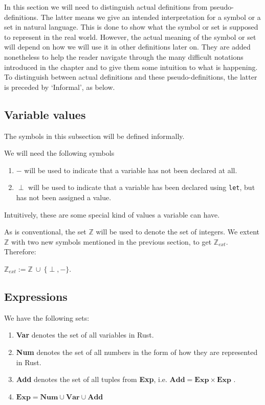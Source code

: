 In this section we will need to distinguish actual definitions from pseudo-definitions. The latter means we give an intended interpretation for a symbol or a set in natural language. This is done to show what the symbol or set is supposed to represent in the real world. However, the actual meaning of the symbol or set will depend on how we will use it in other definitions later on. They are added nonetheless to help the reader navigate through the many difficult notations introduced in the chapter and to give them some intuition to what is happening. To distinguish between actual definitions and these pseudo-definitions, the latter is preceded by `Informal', as below. 

\subsection*{Variable values}
The symbols in this subsection will be defined informally.  

\begin{infdefinition}
We will need the following symbols 
\begin{enumerate}[noitemsep, label={\roman*)}]
    \item $-$ will be used to indicate that a variable has not been declared at all.
    \item $\perp$ will be used to indicate that a variable has been declared using \verb|let|, but has not been assigned a value.
\end{enumerate}
\end{infdefinition}

Intuitively, these are some special kind of values a variable can have. 

As is conventional, the set $\mathbb{Z}$ will be used to denote the set of integers. We extent $\mathbb{Z}$ with two new symbols mentioned in the previous section, to get $\mathbb{Z}_{ext}$. Therefore: 

\begin{definition}
$\mathbb{Z}_{ext} := \mathbb{Z} ~\cup ~ \{\perp, -\}$.
\end{definition}

\subsection*{Expressions}
\begin{definition}
We have the following sets:
\begin{enumerate}[noitemsep, label={\roman*)}]
    \item \textbf{Var} denotes the set of all variables in Rust.
    \item \textbf{Num} denotes the set of all numbers in the form of how they are represented in Rust.
    \item \textbf{Add} denotes the set of all tuples from \textbf{Exp}, i.e. $\textbf{Add} = \textbf{Exp} \times \textbf{Exp}$ . 
    \item $\textbf{Exp} = \textbf{Num} \cup \textbf{Var} \cup \textbf{Add}$
\end{enumerate}
\end{definition}

